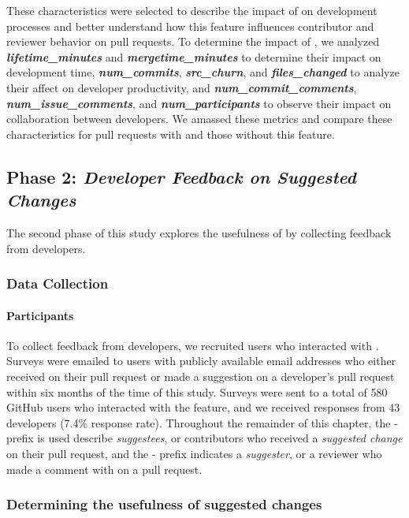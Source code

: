 These characteristics were selected to describe the impact of \sugg on development processes and better understand how this feature influences contributor and reviewer behavior on pull requests. To determine the impact of \suggs, we analyzed \textbf{\em lifetime\_minutes} and \textbf{\em mergetime\_minutes} to determine their impact on development time, \textbf{\em num\_commits}, \textbf{\em src\_churn}, and \textbf{\em files\_changed} to analyze their affect on developer productivity, and \textbf{\em num\_commit\_comments}, \textbf{\em num\_issue\_comments}, and \textbf{\em num\_participants} to observe their impact on collaboration between developers. We amassed these metrics and compare these characteristics for pull requests with \suggs and those without this feature.




\subsection{Phase 2: \textit{Developer Feedback on Suggested Changes}}

The second phase of this study explores the usefulness of \suggs by collecting feedback from developers.

\subsubsection{Data Collection}

\paragraph*{Participants}

To collect feedback from developers, we recruited users who interacted with \suggs. Surveys were emailed to users with publicly available email addresses who either received \sugg on their pull request or made a suggestion on a developer's pull request within six months of the time of this study. Surveys were sent to a total of 580 GitHub users who interacted with the \suggs feature, and we received responses from 43 developers (7.4\% response rate). Throughout the remainder of this chapter, the \see- prefix is used describe \textit{suggestees}, or contributors who received a \textsl{suggested change} on their pull request, and the \ser- prefix indicates a \textit{suggester}, or a reviewer who made a comment with \sugg on a pull request. 


\subsubsection{Determining the usefulness of suggested changes}

